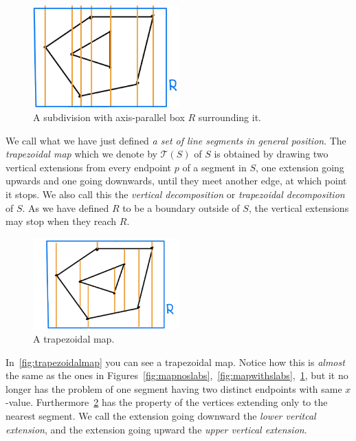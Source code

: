 \begin{figure}[ht]
	\centering
	\includegraphics[width=0.5\textwidth]{figures/plane-with-r.png}
	\caption{\label{fig:planewithr} A subdivision with axis-parallel box $R$ surrounding it.}
\end{figure}


We call what we have just defined \textit{a set of line segments in general position}. The \textit{trapezoidal map} which we denote by $\mathcal{T}(S)$ of $S$ is obtained by drawing two vertical extensions from every endpoint $p$ of a segment in $S$, one extension going upwards and one going downwards, until they meet another edge, at which point it stops. We also call this the \textit{vertical decomposition} or \textit{trapezoidal decomposition} of $S$. As we have defined $R$ to be a boundary outside of $S$, the vertical extensions may stop when they reach $R$.

\begin{figure}[ht]
	\centering
	\includegraphics[width=0.5\textwidth]{figures/trapezoidal-map.png}
	\caption{\label{fig:trapezoidalmap} A trapezoidal map.}
\end{figure}

In~\autoref{fig:trapezoidalmap} you can see a trapezoidal map. Notice how this is \textit{almost} the same as the ones in Figures~\ref{fig:mapnoslabs},~\ref{fig:mapwithslabs},~\ref{fig:planewithr}, but it no longer has the problem of one segment having two distinct endpoints with same $x$-value. Furthermore~\ref{fig:trapezoidalmap} has the property of the vertices extending only to the nearest segment. We call the extension going downward the \textit{lower veritcal extension}, and the extension going upward the \textit{upper vertical extension}.


